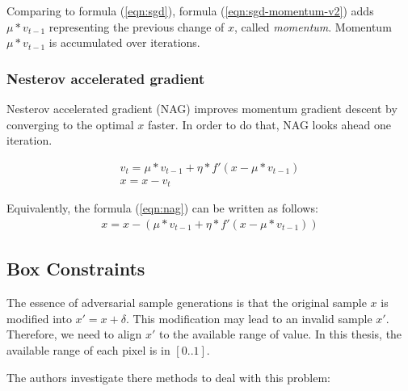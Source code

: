 \documentclass[12pt]{article}
\begin{document}
Comparing to formula (\ref{eqn:sgd}), formula (\ref{eqn:sgd-momentum-v2}) adds $\mu * v_{t-1} $ representing the previous change of $x$, called \textit{momentum}. Momentum $\mu * v_{t-1} $ is accumulated over iterations.

\subsubsection{Nesterov accelerated gradient}

Nesterov accelerated gradient (NAG) improves momentum gradient descent by converging to the optimal $x$ faster. In order to do that, NAG looks ahead one iteration.

\begin{equation}
\begin{split}
\label{eqn:nag}
v_{t} = \mu * v_{t-1} + \eta * f'(x - \mu * v_{t-1})
\\
x = x - v_t
\end{split}
\end{equation}

Equivalently, the formula (\ref{eqn:nag}) can be written as follows:
\begin{equation}
\begin{split}
\label{eqn:sgd-momentum-v2}
x = x - (\mu * v_{t-1} + \eta * f'(x - \mu * v_{t-1}))
\end{split}
\end{equation}

\subsection{Box Constraints}

The essence of adversarial sample generations is that the original sample $x$ is modified into $x' = x + \delta$. This modification may lead to an invalid sample $x'$. Therefore, we need to align $x'$ to the available range of value. In this thesis, the available range of each pixel is in $[0..1]$.

The authors investigate there methods to deal with this problem:
\end{document}

